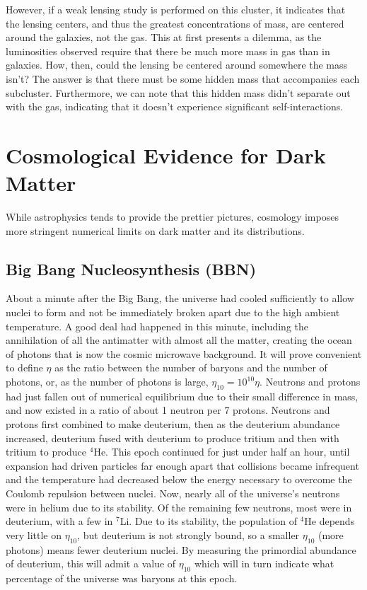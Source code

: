 However, if a weak lensing study is performed on this cluster, it indicates that the lensing centers, and thus the greatest concentrations of mass, are centered around the galaxies, not the gas. This at first presents a dilemma, as the luminosities observed require that there be much more mass in gas than in galaxies. How, then, could the lensing be centered around somewhere the mass isn't? The answer is that there must be some hidden mass that accompanies each subcluster. Furthermore, we can note that this hidden mass didn't separate out with the gas, indicating that it doesn't experience significant self-interactions.

\section{Cosmological Evidence for Dark Matter}

While astrophysics tends to provide the prettier pictures, cosmology imposes more stringent numerical limits on dark matter and its distributions.

\subsection{Big Bang Nucleosynthesis (BBN)}

About a minute after the Big Bang, the universe had cooled sufficiently to allow nuclei to form and not be immediately broken apart due to the high ambient temperature. A good deal had happened in this minute, including the annihilation of all the antimatter with almost all the matter, creating the ocean of photons that is now the cosmic microwave background. It will prove convenient to define $\eta$ as the ratio between the number of baryons and the number of photons, or, as the number of photons is large, $\eta_{10} = 10^{10}\eta$. Neutrons and protons had just fallen out of numerical equilibrium due to their small difference in mass, and now existed in a ratio of about 1 neutron per 7 protons. Neutrons and protons first combined to make deuterium, then as the deuterium abundance increased, deuterium fused with deuterium to produce tritium and then with tritium to produce $^4$He. This epoch continued for just under half an hour, until expansion had driven particles far enough apart that collisions became infrequent and the temperature had decreased below the energy necessary to overcome the Coulomb repulsion between nuclei. Now, nearly all of the universe's neutrons were in helium due to its stability. Of the remaining few neutrons, most were in deuterium, with a few in $^7$Li. Due to its stability, the population of $^4$He depends very little on $\eta_{10}$, but deuterium is not strongly bound, so a smaller $\eta_{10}$ (more photons) means fewer deuterium nuclei. By measuring the primordial abundance of deuterium, this will admit a value of $\eta_{10}$ which will in turn indicate what percentage of the universe was baryons at this epoch.

